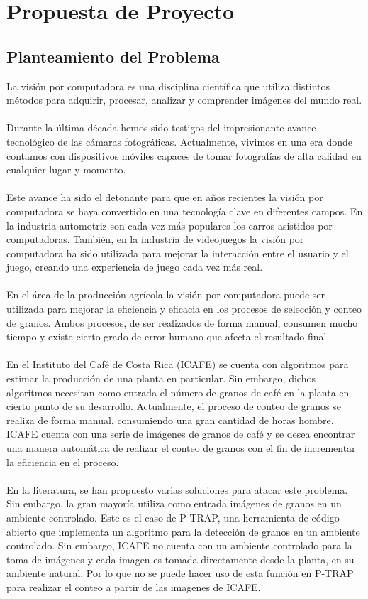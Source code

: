 \section{\textbf{Propuesta de Proyecto}}
\subsection{Planteamiento del Problema}
La visi\'on por computadora es una disciplina cient\'ifica que utiliza distintos m\'etodos para adquirir, procesar, analizar y comprender im\'agenes del mundo real. 
\\\\
Durante la \'ultima d\'ecada hemos sido testigos del impresionante avance tecnol\'ogico de las c\'amaras fotogr\'aficas. Actualmente, vivimos en una era donde contamos con dispositivos m\'oviles capaces de tomar fotograf\'ias de alta calidad en cualquier lugar y momento. 
\\\\
Este avance ha sido el detonante para que en a\~nos recientes la visi\'on por computadora se haya convertido en una tecnolog\'ia clave en diferentes campos. En la industria automotriz son cada vez m\'as populares los carros asistidos por computadoras. Tambi\'en, en la industria de videojuegos la visi\'on por computadora ha sido utilizada para mejorar la interacci\'on entre el usuario y el juego, creando una experiencia de juego cada vez m\'as real.
\\\\
En el \'area de la producci\'on agr\'icola la visi\'on por computadora puede ser utilizada para mejorar la eficiencia y eficacia en los procesos de selecci\'on y conteo de granos. Ambos procesos, de ser realizados de forma manual, consumen mucho tiempo y existe cierto grado de error humano que afecta el resultado final.
\\\\
En el Instituto del Caf\'e de Costa Rica (ICAFE) se cuenta con algoritmos para estimar la producci\'on de una planta en particular. Sin embargo, dichos algoritmos necesitan como entrada el n\'umero de granos de caf\'e en la planta en cierto punto de su desarrollo. Actualmente, el proceso de conteo de granos se realiza de forma manual, consumiendo una gran cantidad de horas hombre. ICAFE cuenta con una serie de im\'agenes de granos de caf\'e y se desea encontrar una manera autom\'atica de realizar el conteo de granos con el fin de incrementar la eficiencia en el proceso.
\\\\
En la literatura, se han propuesto varias soluciones para atacar este problema. Sin embargo, la gran mayor\'ia utiliza como entrada im\'agenes de granos en un ambiente controlado. Este es el caso de P-TRAP, una herramienta de c\'odigo abierto que implementa un algoritmo para la detecci\'on de granos en un ambiente controlado. Sin embargo, ICAFE no cuenta con un ambiente controlado para la toma de im\'agenes y cada imagen es tomada directamente desde la planta, en su ambiente natural. Por lo que no se puede hacer uso de esta funci\'on en P-TRAP para realizar el conteo a partir de las imagenes de ICAFE.

